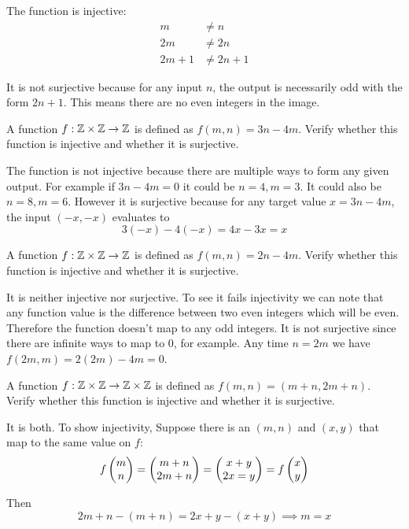 \documentclass{article}
\begin{document}
The function is injective:
\begin{align*}
  m      & \neq n      \\
  2m     & \neq 2n     \\
  2m + 1 & \neq 2n + 1
\end{align*}

It is not surjective because for any input $n$, the output is necessarily odd with the form $2n + 1$. This means there are no even integers in the image.

\begin{problem}
A function $f: \mathbb{Z} \times \mathbb{Z} \to \mathbb{Z}$ is defined as $f(m, n) = 3n - 4m.$ Verify whether this function is injective and whether it is surjective.
\end{problem}

The function is not injective because there are multiple ways to form any given output. For example if $3n - 4m = 0$ it could be $n = 4, m = 3$. It could also be $n = 8, m = 6$. However it is surjective because for any target value $x = 3n - 4m$, the input $(-x, -x)$ evaluates to
$$3(-x) - 4(-x) = 4x - 3x = x$$

\begin{problem}
A function $f: \mathbb{Z} \times \mathbb{Z} \to \mathbb{Z}$ is defined as $f(m, n) = 2n - 4m$. Verify whether this function is injective and whether it is surjective.
\end{problem}

It is neither injective nor surjective. To see it fails injectivity we can note that any function value is the difference between two even integers which will be even. Therefore the function doesn't map to any odd integers. It is not surjective since there are infinite ways to map to 0, for example. Any time $n = 2m$ we have $f(2m, m) = 2(2m) - 4m = 0$.

\begin{problem}
A function $f: \mathbb{Z} \times \mathbb{Z} \to \mathbb{Z} \times \mathbb{Z}$ is defined as $f(m, n) = (m+n, 2m + n)$. Verify whether this function is injective and whether it is surjective.
\end{problem}

It is both. To show injectivity, Suppose there is an $(m, n)$ and $(x, y)$ that map to the same value on $f$:
$$f\begin{pmatrix}m\\n\end{pmatrix} = \begin{pmatrix}m + n\\2m + n\end{pmatrix} = \begin{pmatrix}x + y\\2x = y\end{pmatrix} = f\begin{pmatrix}x\\y\end{pmatrix}$$

Then
$$2m + n - (m + n) = 2x + y - (x + y) \implies m = x$$
\end{document}
